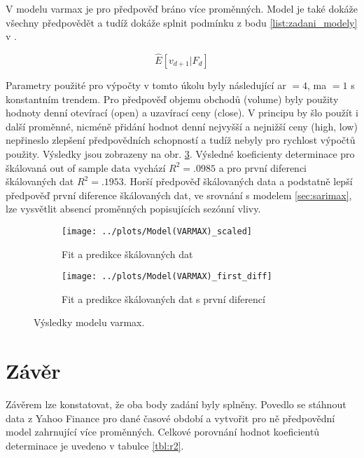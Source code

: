 \documentclass[a4paper,12pt, czech]{article}
\begin{document}
V modelu \gls{varmax} je pro předpověď bráno více proměnných. Model je také dokáže všechny předpovědět a tudíž dokáže splnit podmínku z bodu \ref{list:zadani_modely} v .

\begin{equation}\label{eq:varimax}
\hat{E}\left[v_{d+1}|F_d\right]
\end{equation}

Parametry použité pro výpočty v tomto úkolu byly následující \gls{ar} $= 4$, \gls{ma} $= 1$ s konstantním trendem.
Pro předpověď objemu obchodů (volume) byly použity hodnoty denní otevírací (open) a uzavírací ceny (close).
V principu by šlo použít i další proměnné, nicméně přidání hodnot denní nejvyšší a nejnižší ceny (high, low) nepřineslo zlepšení předpovědních schopností a tudíž nebyly pro rychlost výpočtů použity.
Výsledky jsou zobrazeny na obr. \ref{fig:varmax}.
Výsledné koeficienty determinace pro škálovaná out of sample data vychází $R^2=\num{.0985}$ a pro první diferenci škálovaných dat $R^2=\num{.1953}$.
Horší předpověď škálovaných data a podstatně lepší předpověď první diference škálovaných dat, ve srovnání s modelem \ref{sec:sarimax}, lze vysvětlit absencí proměnných popisujících sezónní vlivy.

\begin{figure}[htb]
	\begin{subfigure}[t]{.5\linewidth}
		\centering
		\texttt{[image: ../plots/Model(VARMAX)\_scaled]}
		\caption{Fit a predikce škálovaných dat}
		\label{fig:varmax_scaled}
	\end{subfigure}
	\begin{subfigure}[t]{.5\linewidth}
		\centering
		\texttt{[image: ../plots/Model(VARMAX)\_first\_diff]}
		\caption{Fit a predikce škálovaných dat s první diferencí}
		\label{fig:varmax_fd}
	\end{subfigure}
	\caption{Výsledky modelu \gls{varmax}.}\label{fig:varmax}
\end{figure}

\clearpage

\section{Závěr}

Závěrem lze konstatovat, že oba body zadání byly splněny.
Povedlo se stáhnout data z Yahoo Finance pro dané časové období a vytvořit pro ně předpovědní model zahrnující více proměnných.
Celkové porovnání hodnot koeficientů determinace je uvedeno v tabulce \ref{tbl:r2}.
\end{document}
